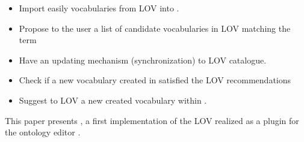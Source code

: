 \begin{itemize}
\item Import easily vocabularies from LOV into \protege. 
\item Propose to the user a list of candidate vocabularies in LOV matching the term
\item Have an updating mechanism (synchronization) to LOV catalogue.
\item Check if a new vocabulary created in \protege satisfied the LOV recommendations \cite{pybernard12}

\item Suggest to LOV a new created vocabulary within \protege.
\end{itemize}

This paper presents \protege, a first implementation of the LOV realized as a plugin for the ontology editor \protege. 
 
